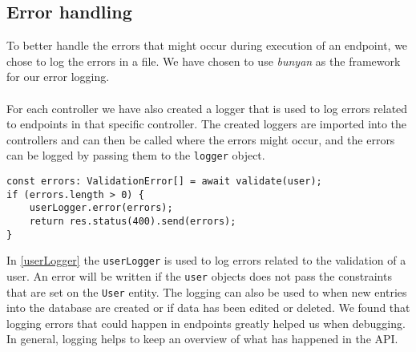 \subsection{Error handling}
To better handle the errors that might occur during execution of an endpoint, we chose to log the errors in a file.
We have chosen to use \textit{bunyan} as the framework for our error logging.
\\\\
For each controller we have also created a logger that is used to log errors related to endpoints in that specific controller.
The created loggers are imported into the controllers and can then be called where the errors might occur, and the errors can be logged by passing them to the \texttt{logger} object.
\begin{lstlisting}[caption={Shows how the userLogger is used to log errors}, captionpos=b, label={userLogger}]
const errors: ValidationError[] = await validate(user);
if (errors.length > 0) {
    userLogger.error(errors);
    return res.status(400).send(errors);
}
\end{lstlisting}
In \autoref{userLogger} the \texttt{userLogger} is used to log errors related to the validation of a user. 
An error will be written if the \texttt{user} objects does not pass the constraints that are set on the \texttt{User} entity.
The logging can also be used to when new entries into the database are created or if data has been edited or deleted.
We found that logging errors that could happen in endpoints greatly helped us when debugging.
In general, logging helps to keep an overview of what has happened in the API.
